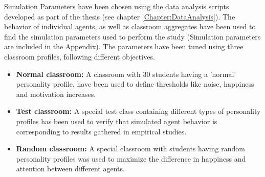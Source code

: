 \bb

Simulation Parameters have been chosen using the data analysis scripts developed
as part of the thesis (see chapter \ref{Chapter:DataAnalysis}). The behavior
of individual agents, as well as classroom aggregates have been used to find
the simulation parameters used to perform the study (Simulation parameters are included
in the Appendix). The parameters have been tuned using three classroom profiles,
following different objectives.

\begin{itemize}
    \item \textbf{Normal classroom:} A classroom with 30 students having a 'normal'
    personality profile, have been used to define thresholds like noise, happiness
    and motivation increases.
    \item \textbf{Test classroom:} A special test class containing different types of
    personality profiles has been used to verify that simulated agent behavior is
    corresponding to results gathered in empirical studies.
    \item \textbf{Random classroom:} A special classroom with students having random
    personality profiles was used to maximize the difference in happiness and attention
    between different agents.
\end{itemize}
